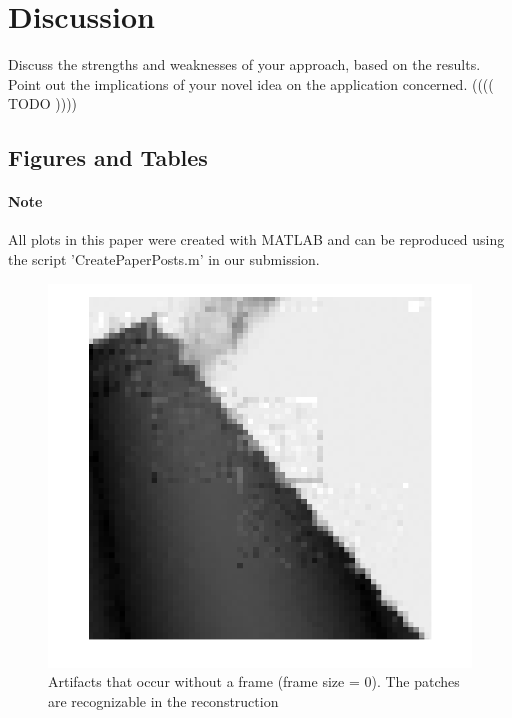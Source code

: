 \documentclass[10pt,conference,compsocconf]{IEEEtran}
\begin{document}
\section{Discussion}
  Discuss the strengths and weaknesses of your
  approach, based on the results. Point out the implications of your  
  novel idea on the application concerned. (((( TODO ))))


\subsection{Figures and Tables}

\paragraph{Note}
All plots in this paper were created with MATLAB and can be reproduced using the script 'CreatePaperPosts.m' in our submission.\\

\begin{figure}[tbp]
  \centering
  \includegraphics[width=\columnwidth]{images/boundaryArtifact_noframe.png}
  \caption{Artifacts that occur without a frame (frame size = 0). The patches are recognizable in the reconstruction}
  \label{fig:boundaryArtifacts}
\end{figure}
\end{document}
